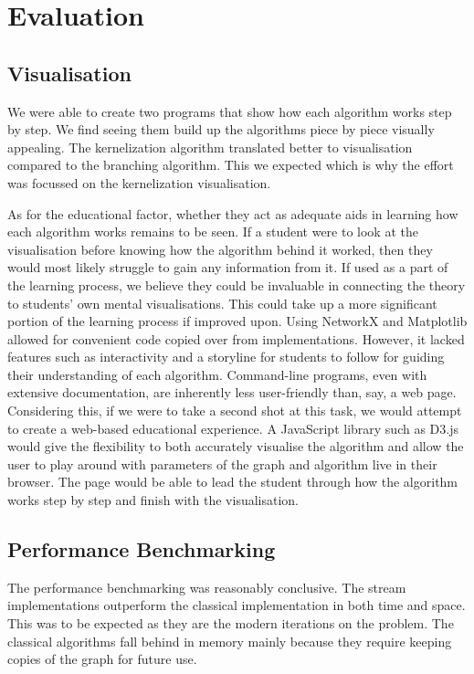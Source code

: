 \section{Evaluation}

\subsection{Visualisation}

We were able to create two programs that show how each algorithm works step by
step. We find seeing them build up the algorithms piece by piece visually
appealing. The kernelization algorithm translated better to visualisation
compared to the branching algorithm. This we expected which is why the effort
was focussed on the kernelization visualisation.

As for the educational factor, whether they act as adequate aids in learning
how each algorithm works remains to be seen. If a student were to look at the
visualisation before knowing how the algorithm behind it worked, then they
would most likely struggle to gain any information from it. If used as a part
of the learning process, we believe they could be invaluable in connecting the
theory to students' own mental visualisations. This could take up a more
significant portion of the learning process if improved upon. Using NetworkX
and Matplotlib allowed for convenient code copied over from implementations.
However, it lacked features such as interactivity and a storyline for students
to follow for guiding their understanding of each algorithm. Command-line
programs, even with extensive documentation, are inherently less user-friendly
than, say, a web page. Considering this, if we were to take a second shot at
this task, we would attempt to create a web-based educational experience. A
JavaScript library such as D3.js \cite{bostock2011d3} would give the
flexibility to both accurately visualise the algorithm and allow the user to
play around with parameters of the graph and algorithm live in their browser.
The page would be able to lead the student through how the algorithm works step
by step and finish with the visualisation.

\subsection{Performance Benchmarking}

The performance benchmarking was reasonably conclusive. The stream
implementations outperform the classical implementation in both time and space.
This was to be expected as they are the modern iterations on the problem. The
classical algorithms fall behind in memory mainly because they require keeping
copies of the graph for future use.

